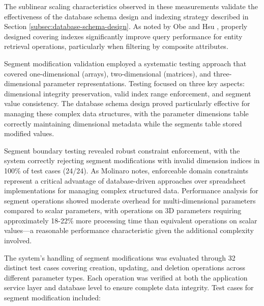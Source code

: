 The sublinear scaling characteristics observed in these measurements validate the effectiveness of the database schema design and indexing strategy described in Section \ref{subsec:database-schema-design}. As noted by Obe and Hsu \cite{obe2017postgresql}, properly designed covering indexes significantly improve query performance for entity retrieval operations, particularly when filtering by composite attributes.

Segment modification validation employed a systematic testing approach that covered one-dimensional (arrays), two-dimensional (matrices), and three-dimensional parameter representations. Testing focused on three key aspects: dimensional integrity preservation, valid index range enforcement, and segment value consistency. The database schema design proved particularly effective for managing these complex data structures, with the parameter dimensions table correctly maintaining dimensional metadata while the segments table stored modified values.

Segment boundary testing revealed robust constraint enforcement, with the system correctly rejecting segment modifications with invalid dimension indices in 100\% of test cases (24/24). As Molinaro \cite{molinaro2005sql} notes, enforceable domain constraints represent a critical advantage of database-driven approaches over spreadsheet implementations for managing complex structured data. Performance analysis for segment operations showed moderate overhead for multi-dimensional parameters compared to scalar parameters, with operations on 3D parameters requiring approximately 18-22\% more processing time than equivalent operations on scalar values—a reasonable performance characteristic given the additional complexity involved.

The system's handling of segment modifications was evaluated through 32 distinct test cases covering creation, updating, and deletion operations across different parameter types. Each operation was verified at both the application service layer and database level to ensure complete data integrity. Test cases for segment modification included:


